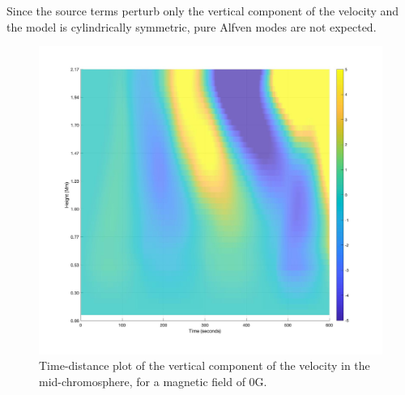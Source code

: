 \documentclass[physics,article,submit,pdftex,moreauthors]{Definitions/mdpi}
\begin{document}
  Since the source terms perturb only the vertical component of the velocity and the model is cylindrically symmetric, pure Alfven modes are not expected. 





\begin{figure}
\centering
\label{td_vert_dif_bv0G_100G_300}
\includegraphics[scale=0.2]{td_vert_bv0G_300.jpg}
\caption{Time-distance plot of the vertical component of the velocity in the mid-chromosphere, for a magnetic field of 0G.}
\end{figure}
\end{document}
